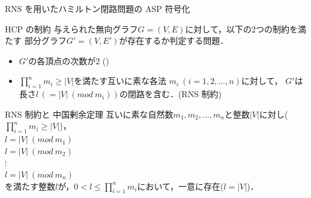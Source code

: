 \documentclass[dvipdfmx]{beamer}
\begin{document}
\begin{frame}[noframenumbering]{RNS を用いたハミルトン閉路問題の ASP 符号化}
\thispagestyle{empty}
\begin{block}{HCP の制約}
  与えられた無向グラフ$G= (V,E)$に対して，以下の2つの制約を満たす
  部分グラフ$G'= (V,E')$が存在するか判定する問題．
  \begin{itemize}
  \item $G'$の各頂点の次数が2 ()
  \item $\prod_{i=1}^{n}m_i \geq |V|$を満たす互いに素な各法
	$m_i\ (i=1,2,...,n)$に対して，
	$G'$は長さ$l\, (= |V|\ (mod\ m_i))$の閉路を含む．(\alert{RNS 制約})
  \end{itemize}
\end{block}

\begin{alertblock}{RNS 制約と 中国剰余定理}
 互いに素な自然数$m_1,m_2,...,m_n$と整数$|V|$に対し($\prod_{i=1}^{n}m_i \geq |V|$)，\\
{\centering
 $l = |V|\ (mod\ m_1)$\\
 $l = |V|\ (mod\ m_2)$\\
 $\vdots$\\
 $l = |V|\ (mod\ m_n)$\\
}
を満たす整数$l$が，$0 < l \leq \prod_{i=1}^{n}m_i$において，一意に存在($l=|V|$)．
\end{alertblock}
\end{frame}
\end{document}
